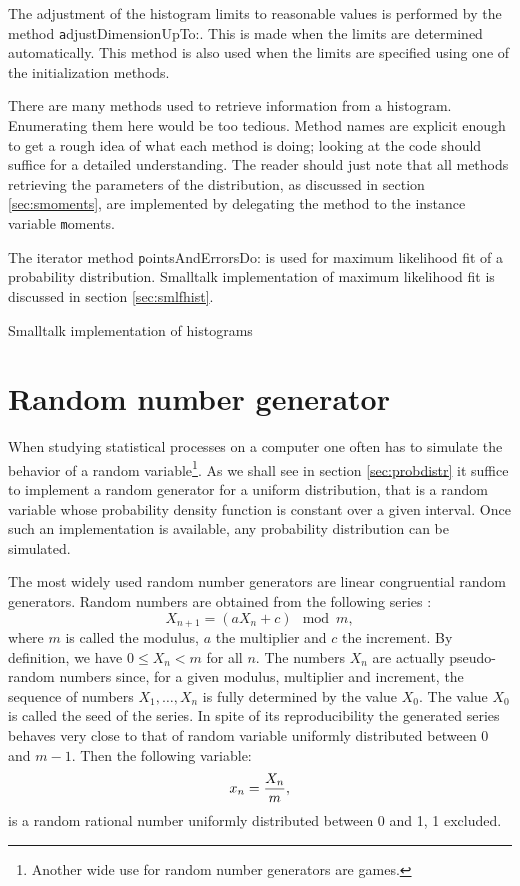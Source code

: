 The adjustment of the histogram limits to reasonable values is
performed by the method {\texttt adjustDimensionUpTo:}. This is made
when the limits are determined automatically. This method is also
used when the limits are specified using one of the initialization
methods.

There are many methods used to retrieve information from a
histogram. Enumerating them here would be too tedious. Method
names are explicit enough to get a rough idea of what each method
is doing; looking at the code should suffice for a detailed
understanding. The reader should just note that all methods
retrieving the parameters of the distribution, as discussed in
section \ref{sec:smoments}, are implemented by delegating the
method to the instance variable {\texttt moments}.

The iterator method {\texttt pointsAndErrorsDo:} is used for maximum
likelihood fit of a probability distribution. Smalltalk
implementation of maximum likelihood fit is discussed in section
\ref{sec:smlfhist}.

\begin{listing} Smalltalk implementation of histograms \label{ls:histogram}

\end{listing}


\section{Random number generator}
\label{sec:random} When studying statistical processes on a
computer one often has to simulate the behavior of a random
variable\footnote{Another wide use for random number generators
are games.}. As we shall see in section \ref{sec:probdistr} it
suffice to implement a random generator for a uniform
distribution, that is a random variable whose probability density
function is constant over a given interval. Once such an
implementation is available, any probability distribution can be
simulated.

 The most widely
used random number generators are linear congruential random
generators. Random numbers are obtained from the following series
\cite{Knuth2}:
\begin{equation}
\label{eq:crg}
  X_{n+1} = \left(aX_n+c\right) \mod m,
\end{equation}
where $m$ is called the modulus, $a$ the multiplier and $c$ the
increment. By definition, we have $0\leq X_n<m$ for all $n$. The
numbers $X_n$ are actually pseudo-random numbers since, for a
given modulus, multiplier and increment, the sequence of numbers
$X_1,\ldots,X_n$ is fully determined by the value $X_0$. The value
$X_0$ is called the seed of the series. In spite of its
reproducibility the generated series behaves very close to that of
random variable uniformly distributed between 0 and $m-1$. Then
the following variable:
\begin{equation}
  x_n = {X_n \over m},
\end{equation}
is a random rational number uniformly distributed between 0 and 1,
1 excluded.

